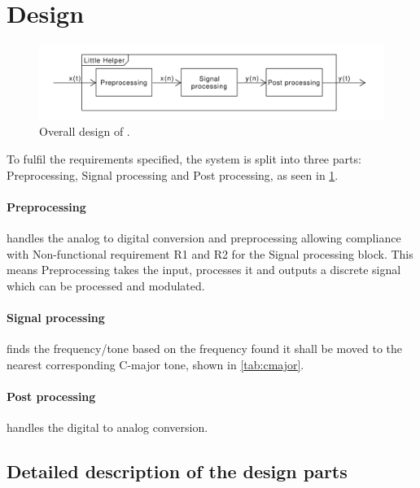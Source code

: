 
\section{Design}
\label{ch:Design}
\begin{figure}
	\centering
	\includegraphics[width=1\linewidth]{gfx/Design/OverallDesign.pdf}
	\caption{Overall design of \systemName.}
	\label{fig:overalldesign}
\end{figure}

To fulfil the requirements specified, the system is split into three parts: Preprocessing, Signal processing and Post processing, as seen in \cref{fig:overalldesign}.

\paragraph{Preprocessing} handles the analog to digital conversion and preprocessing allowing compliance with Non-functional requirement R1 and R2 for the Signal processing block.
This means Preprocessing takes the input, processes it and outputs a discrete signal which can be processed and modulated.

\paragraph{Signal processing} finds the frequency/tone based on the frequency found it shall be moved to the nearest corresponding C-major tone, shown in \cref{tab:cmajor}.

\paragraph{Post processing} handles the digital to analog conversion.

\subsection{Detailed description of the design parts}
